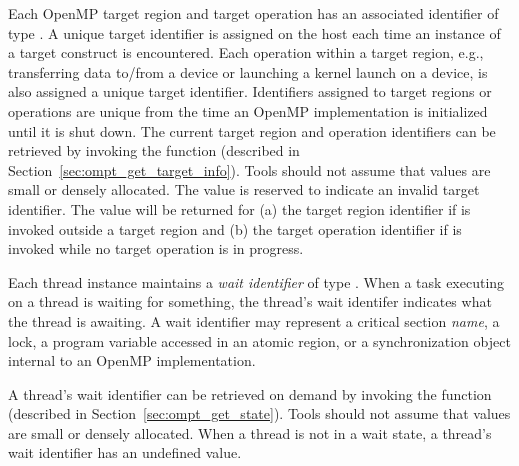 Each OpenMP target region and target operation has an associated identifier of type .
A unique target identifier is assigned on the host each time an instance of a target construct is encountered.
Each operation within a target region, e.g., transferring data to/from a device or launching a kernel launch
on a device, is also assigned a unique target identifier.
Identifiers assigned to target regions or operations
are unique from the time an OpenMP implementation is initialized until it is shut down.
The current target region and operation identifiers can be retrieved by invoking the  function (described in Section~\ref{sec:ompt_get_target_info}).
Tools should not assume that  values are small or densely allocated.
The value  is reserved to indicate an invalid target identifier.
The value  will be returned for (a) the target region identifier if  is invoked outside a target region and (b) the target operation identifier if  is invoked while no target operation is in progress.


Each thread instance maintains a {\em wait identifier} of type .
When a task executing on a thread is waiting for something, the thread's wait identifer indicates what the thread is awaiting.
A wait identifier may represent a critical section {\em name}, a lock,  a program variable accessed in an atomic region, or a synchronization object internal to an OpenMP implementation.
\begin{comment}
\begin{boxedcode}
typedef unsigned long long int ompt\_wait\_id\_t;
\end{boxedcode}
\end{comment}
A thread's wait identifier can be retrieved on demand by invoking the  function (described in Section~\ref{sec:ompt_get_state}).
Tools should not assume that  values are small or densely allocated.
When a thread is not in a wait state, a thread's wait identifier has an undefined value.


